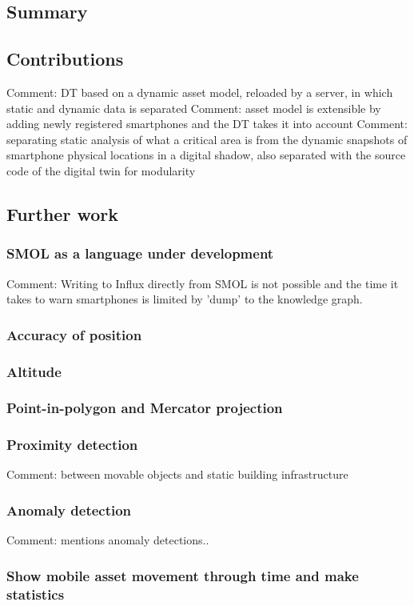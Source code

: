 \documentclass{article}
\begin{document}
\subsection{Summary}
\subsection{Contributions}
Comment: DT based on a dynamic asset model, reloaded by a server, in which static and dynamic data is separated
Comment: asset model is extensible by adding newly registered smartphones and the DT takes it into account
Comment: separating static analysis of what a critical area is from the dynamic snapshots of smartphone physical locations in a digital shadow, also separated with the source code of the digital twin for modularity
\subsection{Further work}
\subsubsection{SMOL as a language under development}
Comment: Writing to Influx directly from SMOL is not possible and the time it takes to warn smartphones is limited by 'dump' to the knowledge graph.
\subsubsection{Accuracy of position}
\subsubsection{Altitude}
\subsubsection{Point-in-polygon and Mercator projection}
\subsubsection{Proximity detection}
Comment: between movable objects and static building infrastructure
\subsubsection{Anomaly detection}
Comment: \cite{li_digital_2022} mentions anomaly detections..
\subsubsection{Show mobile asset movement through time and make statistics}




\newpage
\printbibliography
\end{document}
